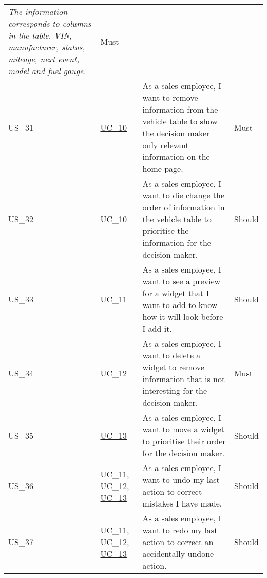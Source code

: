 \begin{footnotesize}
\begin{longtable}[L L L L]{ p{} p{} p{} p{} }
      \emph{The information corresponds to columns in the table. VIN, manufacturer, status, mileage, next event, model and fuel gauge.} & Must  \\
      \hypertarget{Ref:US31}{US\_31} & \hyperlink{Ref:UC10}{UC\_10} & As a sales employee, I want to remove information from the vehicle table to show the decision maker only relevant information on the home page. & Must  \\
      \hypertarget{Ref:US32}{US\_32} & \hyperlink{Ref:UC10}{UC\_10} & As a sales employee, I want to die change the order of information in the vehicle table to prioritise the information for the decision maker. & Should  \\

      \hypertarget{Ref:US33}{US\_33} & \hyperlink{Ref:UC11}{UC\_11} & As a sales employee, I want to see a preview for a widget that I want to add to know how it will look before I add it. & Should \\
      \hypertarget{Ref:US34}{US\_34} & \hyperlink{Ref:UC12}{UC\_12} & As a sales employee, I want to delete a widget to remove information that is not interesting for the decision maker. & Must \\
      \hypertarget{Ref:US35}{US\_35} & \hyperlink{Ref:UC13}{UC\_13} \  & As a sales employee, I want to move a widget to prioritise their order for the decision maker. & Should \\
      \hypertarget{Ref:US36}{US\_36} & \hyperlink{Ref:UC11}{UC\_11}, \newline \hyperlink{Ref:UC12}{UC\_12}, \newline \hyperlink{Ref:UC13}{UC\_13} & As a sales employee, I want to undo my last action to correct mistakes I have made. & Should \\
      \hypertarget{Ref:US37}{US\_37} & \hyperlink{Ref:UC11}{UC\_11}, \newline \hyperlink{Ref:UC12}{UC\_12}, \newline \hyperlink{Ref:UC13}{UC\_13} & As a sales employee, I want to redo my last action to correct an accidentally undone action. & Should \\
      \bottomrule
    \end{longtable}
  \end{footnotesize}
  \rmfamily

